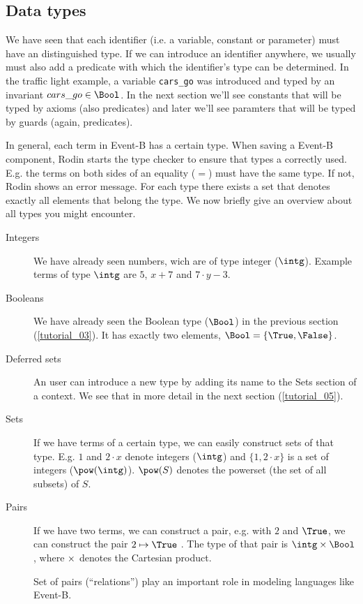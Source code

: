 \subsection{Data types}
\label{tut04:types}
We have seen that each identifier (i.e. a variable, constant or parameter) must have an distinguished type.
If we can introduce an identifier anywhere, we usually must also add a predicate with which the
identifier's type can be determined. In the traffic light example, a variable \texttt{cars\_go} was
introduced and typed by an invariant $cars\_go \in \Bool$. In the next section we'll see constants that
will be typed by axioms (also predicates) and later we'll see paramters that will be typed by guards (again, predicates).

In general, each term in Event-B has a certain type. 
When saving a Event-B component, Rodin starts the type checker to ensure that types a correctly used.
E.g. the terms on both sides of an equality ($=$) must have the same type. If not, Rodin shows an error message.
For each type there exists a set that denotes exactly all elements that belong the type. We now briefly
give an overview about all types you might encounter.

\begin{description}
\item[Integers] 
  We have already seen numbers, wich are of type integer ($\intg$).
  Example terms of type $\intg$ are $5$, $x+7$ and $7 \cdot y - 3$.
\item[Booleans] 
  We have already seen the Boolean type ($\Bool$) in the previous section (\ref{tutorial_03}).
  It has exactly two elements, $\Bool = \{\True,\False\}$.
\item[Deferred sets] 
  An user can introduce a new type by adding its name to the
  \textsf{Sets} section of a context. We see that in more detail in the next section (\ref{tutorial_05}).
\item[Sets]
  If we have terms of a certain type, we can easily construct sets of that type.
  E.g. $1$ and $2\cdot x$ denote integers ($\intg$) and $\{1,2\cdot x\}$ is a set of integers ($\pow(\intg)$).
  $\pow(S)$  denotes the powerset (the set of all subsets) of $S$.
\item[Pairs] 
  If we have two terms, we can construct a pair, e.g. with $2$ and $\True$, we
  can construct the pair $2\mapsto\True$ .
  The type of that pair is $\intg\cprod\Bool$, where $\mathbin\times$ denotes the Cartesian product.

  Set of pairs (``relations'') play an important role in modeling languages like Event-B.
\end{description}

